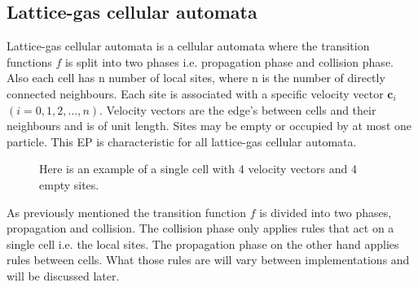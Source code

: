 \documentclass[a4paper,12pt]{article}
\begin{document}
\subsection{Lattice-gas cellular automata}
Lattice-gas cellular automata is a cellular automata where the transition functions $f$ is split into two phases i.e. propagation phase and collision phase. Also each cell has n number of local sites, where n is the number of directly connected neighbours. Each site is associated with a specific velocity vector $\textbf{c}_{i}$ $( i = 0,1,2,\dots,n)$. Velocity vectors are the edge's between cells and their neighbours and is of unit length. Sites may be empty or occupied by at most one particle. This \gls{EP} is characteristic for all lattice-gas cellular automata.   
\begin{figure}[H]
  \centering
  \caption{Here is an example of a single cell with 4 velocity vectors and 4 empty sites.}
  \label{figure:single-cell}
\end{figure}
\noindent As previously mentioned the transition function $f$ is divided into two phases, propagation and collision.
The collision phase only applies rules that act on a single cell i.e. the local sites.
The propagation phase on the other hand applies rules between cells. What those rules are will vary between implementations and will be discussed later.
\end{document}
